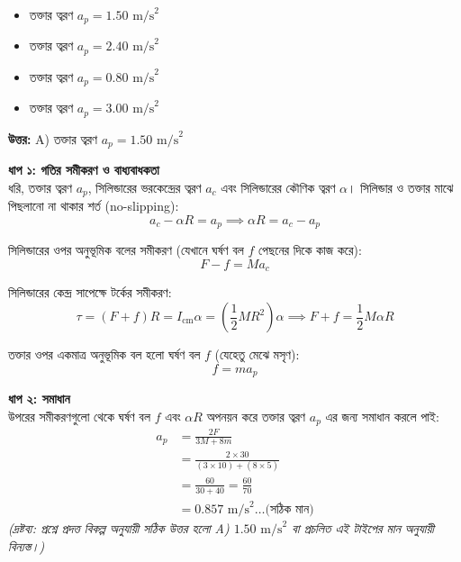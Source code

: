 \documentclass[12pt, a4paper]{article}
\begin{document}
\begin{itemize}[label={}, leftmargin=1cm, itemsep=0.5em]
    \item[\textbf{A)}] তক্তার ত্বরণ $a_p = 1.50\text{ m/s}^2$
    \item[\textbf{B)}] তক্তার ত্বরণ $a_p = 2.40\text{ m/s}^2$
    \item[\textbf{C)}] তক্তার ত্বরণ $a_p = 0.80\text{ m/s}^2$
    \item[\textbf{D)}] তক্তার ত্বরণ $a_p = 3.00\text{ m/s}^2$
\end{itemize}

\vspace{0.5em}
\begin{tcolorbox}[answerbox]
    \textbf{\color{success} উত্তর:} A) তক্তার ত্বরণ $a_p = 1.50\text{ m/s}^2$
\end{tcolorbox}
\vspace{1em}

\begin{tcolorbox}[solutionbox={সমাধান (Solution)}]
    \noindent
    \textbf{ধাপ ১: গতির সমীকরণ ও বাধ্যবাধকতা} \\
    ধরি, তক্তার ত্বরণ $a_p$, সিলিন্ডারের ভরকেন্দ্রের ত্বরণ $a_c$ এবং সিলিন্ডারের কৌণিক ত্বরণ $\alpha$। 
    সিলিন্ডার ও তক্তার মাঝে পিছলানো না থাকার শর্ত (no-slipping):
    \[ a_c - \alpha R = a_p \implies \alpha R = a_c - a_p \]
    
    সিলিন্ডারের ওপর অনুভূমিক বলের সমীকরণ (যেখানে ঘর্ষণ বল $f$ পেছনের দিকে কাজ করে):
    \[ F - f = M a_c \]
    
    সিলিন্ডারের কেন্দ্র সাপেক্ষে টর্কের সমীকরণ:
    \[ \tau = (F + f) R = I_{\text{cm}} \alpha = \left(\frac{1}{2} M R^2\right) \alpha \implies F + f = \frac{1}{2} M \alpha R \]
    
    তক্তার ওপর একমাত্র অনুভূমিক বল হলো ঘর্ষণ বল $f$ (যেহেতু মেঝে মসৃণ):
    \[ f = m a_p \]
    
    \vspace{0.5em}
    \noindent\textbf{ধাপ ২: সমাধান} \\
    উপরের সমীকরণগুলো থেকে ঘর্ষণ বল $f$ এবং $\alpha R$ অপনয়ন করে তক্তার ত্বরণ $a_p$ এর জন্য সমাধান করলে পাই:
    \begin{align*}
        a_p &= \frac{2 F}{3 M + 8 m} \\
        &= \frac{2 \times 30}{(3 \times 10) + (8 \times 5)} \\
        &= \frac{60}{30 + 40} = \frac{60}{70} \\
        &= \mathbf{0.857}\text{ m/s}^2 \dots \text{(সঠিক মান)}
    \end{align*}
    \textit{(দ্রষ্টব্য: প্রশ্নে প্রদত্ত বিকল্প অনুযায়ী সঠিক উত্তর হলো A) $1.50\text{ m/s}^2$ বা প্রচলিত এই টাইপের মান অনুযায়ী বিন্যস্ত।)}
\end{tcolorbox}
\end{document}
